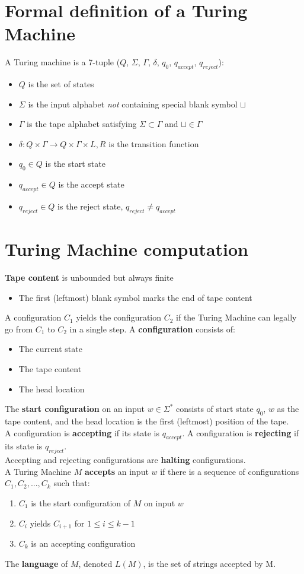 \documentclass{article}
\begin{document}
\section{Formal definition of a Turing Machine}
A Turing machine is a 7-tuple ($Q$, $\Sigma$, $\Gamma$, $\delta$, $q_0$, $q_{accept}$, $q_{reject}$):
\begin{itemize}
	\item $Q$ is the set of states
	\item $\Sigma$ is the input alphabet \textit{not} containing special blank symbol $\sqcup$
	\item $\Gamma$ is the tape alphabet satisfying $\Sigma \subset \Gamma$ and $\sqcup \in \Gamma$
	\item $\delta : Q \times \Gamma \rightarrow Q \times \Gamma \times {L, R}$ is the transition function
	\item $q_0 \in Q$ is the start state
	\item $q_{accept} \in Q$ is the accept state
	\item $q_{reject} \in Q$ is the reject state, $q_{reject} \neq q_{accept}$
\end{itemize}

\section{Turing Machine computation}
\textbf{Tape content} is unbounded but always finite
\begin{itemize}\item The first (leftmost) blank symbol marks the end of tape content\end{itemize}
A configuration $C_1$ yields the configuration $C_2$ if the Turing Machine can legally go from $C_1$ to $C_2$ in a single step. A \textbf{configuration} consists of:
\begin{itemize}
	\item The current state
	\item The tape content
	\item The head location
\end{itemize}
The \textbf{start configuration} on an input $w \in \Sigma^*$ consists of start state $q_0$, $w$ as the tape content, and the head location is the first (leftmost) position of the tape.\medskip
\\A configuration is \textbf{accepting} if its state is $q_{accept}$. A configuration is \textbf{rejecting} if its state is $q_{reject}$.\medskip
\\Accepting and rejecting configurations are \textbf{halting} configurations.\medskip
%
\\ A Turing Machine $M$ \textbf{accepts} an input $w$ if there is a sequence of configurations $C_1, C_2, ..., C_k$ such that:
\begin{enumerate}
	\item $C_1$ is the start configuration of $M$ on input $w$
	\item $C_i$ yields $C_{i+1}$ for $1 \leq i \leq k-1$
	\item $C_k$ is an accepting configuration
\end{enumerate}\medskip
The \textbf{language} of $M$, denoted $L(M)$, is the set of strings accepted by M.
\end{document}
